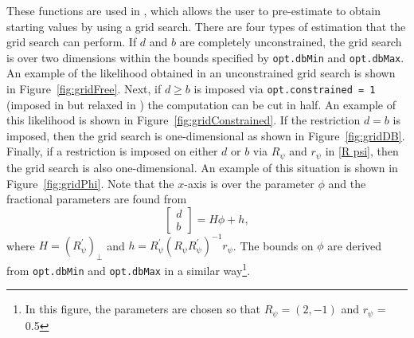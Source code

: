 \documentclass[article]{jss}
\newcommand{\fct}[1]{\code{#1()}}
\begin{document}
These functions are used in \fct{LikeGrid.m}, which allows the user to pre-estimate to obtain starting values by using a grid search. There are four types of estimation that the grid search can perform. If $d$ and $b$ are completely unconstrained, the grid search is over two dimensions within the bounds specified by \verb|opt.dbMin| and \verb|opt.dbMax|. An example of the likelihood obtained in an unconstrained grid search is shown in Figure~\ref{fig:gridFree}. Next, if $d\ge b$ is imposed via \verb|opt.constrained = 1| (imposed in \cite{johansen2012likelihood} but relaxed in \cite{JN2018}) the computation can be cut in half. An example of this likelihood is shown in Figure~\ref{fig:gridConstrained}. If the restriction $d=b$ is imposed, then the grid search is one-dimensional as shown in Figure~\ref{fig:gridDB}. Finally, if a restriction is imposed on either $d$ or $b$ via $R_\psi$ and $r_\psi$ in \eqref{R psi}, then the grid search is also one-dimensional. An example of this situation is shown in Figure~\ref{fig:gridPhi}. Note that the $x$-axis is over the parameter $\phi$ and the fractional parameters are found from
\begin{equation}
  \begin{bmatrix}
    d \\ b
  \end{bmatrix}
  = H\phi + h,
\end{equation}
where $H = (R_{\psi}^{\prime})_\perp$ and $h = R_{\psi}^{\prime} (R_\psi R_{\psi}^{\prime})^{-1} r_\psi$. The bounds on $\phi$ are derived from \verb|opt.dbMin| and \verb|opt.dbMax| in a similar way\footnote{In this figure, the parameters are chosen so that $R_{\psi} = (2, -1)$ and $r_\psi$ = 0.5}.
\end{document}
